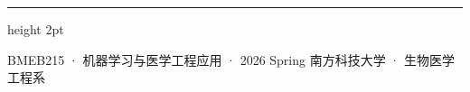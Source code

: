 \documentclass[12pt, a0paper]{article}
\renewcommand{\footnotesize}{\fontsize{15}{20}\selectfont}
\begin{document}
\vspace{4mm}
{\color{myteal}\hrule height 2pt}
\vspace{3mm}
\begin{center}
{\footnotesize\color{mygray}
    BMEB215 · 机器学习与医学工程应用 · 2026 Spring \hspace{3em}
    南方科技大学 · 生物医学工程系
}
\end{center}
\end{document}

